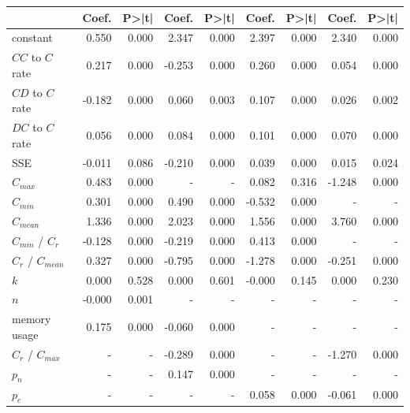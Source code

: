 \begin{tabular}{lrrrrrrrr}
\toprule
{} &  Coef. &  P>|t| &  Coef. &  P>|t| &  Coef. &  P>|t| &  Coef. &  P>|t| \\
\midrule
constant           &  0.550 &  0.000 &  2.347 &  0.000 &  2.397 &  0.000 &  2.340 &  0.000 \\
$CC$ to $C$ rate   &  0.217 &  0.000 & -0.253 &  0.000 &  0.260 &  0.000 &  0.054 &  0.000 \\
$CD$ to $C$ rate   & -0.182 &  0.000 &  0.060 &  0.003 &  0.107 &  0.000 &  0.026 &  0.002 \\
$DC$ to $C$ rate   &  0.056 &  0.000 &  0.084 &  0.000 &  0.101 &  0.000 &  0.070 &  0.000 \\
SSE                & -0.011 &  0.086 & -0.210 &  0.000 &  0.039 &  0.000 &  0.015 &  0.024 \\
$C_{max}$          &  0.483 &  0.000 &      - &      - &  0.082 &  0.316 & -1.248 &  0.000 \\
$C_{min}$          &  0.301 &  0.000 &  0.490 &  0.000 & -0.532 &  0.000 &      - &      - \\
$C_{mean}$         &  1.336 &  0.000 &  2.023 &  0.000 &  1.556 &  0.000 &  3.760 &  0.000 \\
$C_{min}$ / $C_r$  & -0.128 &  0.000 & -0.219 &  0.000 &  0.413 &  0.000 &      - &      - \\
$C_r$ / $C_{mean}$ &  0.327 &  0.000 & -0.795 &  0.000 & -1.278 &  0.000 & -0.251 &  0.000 \\
$k$                &  0.000 &  0.528 &  0.000 &  0.601 & -0.000 &  0.145 &  0.000 &  0.230 \\
$n$                & -0.000 &  0.001 &      - &      - &      - &      - &      - &      - \\
memory usage       &  0.175 &  0.000 & -0.060 &  0.000 &      - &      - &      - &      - \\
$C_r$ / $C_{max}$  &      - &      - & -0.289 &  0.000 &      - &      - & -1.270 &  0.000 \\
$p_n$              &      - &      - &  0.147 &  0.000 &      - &      - &      - &      - \\
$p_e$              &      - &      - &      - &      - &  0.058 &  0.000 & -0.061 &  0.000 \\
\bottomrule
\end{tabular}
